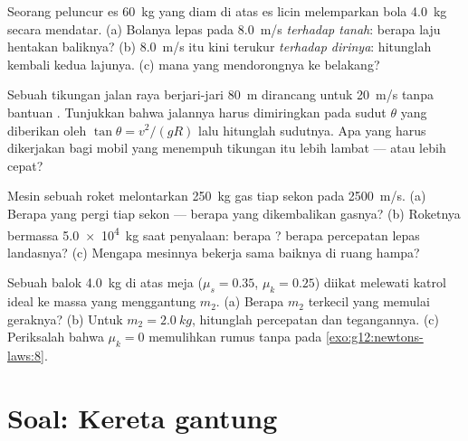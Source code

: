 \begin{exercise}[$\star\star\star$]\label{exo:g12:newtons-laws:12}
Seorang peluncur es \qty{60}{kg} yang diam di atas es licin melemparkan bola
\qty{4.0}{kg} secara mendatar. (a) Bolanya lepas pada \qty{8.0}{m/s} \emph{terhadap
tanah}: berapa laju hentakan baliknya? (b) \qty{8.0}{m/s} itu kini terukur
\emph{terhadap dirinya}: hitunglah kembali kedua lajunya. (c)  mana yang mendorongnya
ke belakang?
\end{exercise}

\begin{exercise}[$\star\star\star$]\label{exo:g12:newtons-laws:13}
Sebuah tikungan jalan raya berjari-jari \qty{80}{m} dirancang untuk \qty{20}{m/s}
tanpa bantuan . Tunjukkan bahwa jalannya harus dimiringkan pada sudut $\theta$
yang diberikan oleh $\tan\theta = v^2/(gR)$ lalu hitunglah sudutnya. Apa yang harus
dikerjakan  bagi mobil yang menempuh tikungan itu lebih lambat --- atau
lebih cepat?
\end{exercise}

\begin{exercise}[$\star\star\star$]\label{exo:g12:newtons-laws:14}
Mesin sebuah roket melontarkan \qty{250}{kg} gas tiap sekon pada \qty{2500}{m/s}. (a)
Berapa  yang pergi tiap sekon ---  berapa yang dikembalikan
gasnya? (b) Roketnya bermassa \qty{5.0e4}{kg} saat penyalaan: berapa ? berapa
percepatan lepas landasnya? (c) Mengapa mesinnya bekerja sama baiknya di ruang hampa?
\end{exercise}

\begin{exercise}[$\star\star\star$]\label{exo:g12:newtons-laws:15}
Sebuah balok \qty{4.0}{kg} di atas meja ($\mu_s = 0.35$, $\mu_k = 0.25$) diikat
melewati katrol ideal ke massa yang menggantung $m_2$. (a) Berapa $m_2$ terkecil yang
memulai geraknya? (b) Untuk $m_2 = \qty{2.0}{kg}$, hitunglah percepatan dan
tegangannya. (c) Periksalah bahwa $\mu_k = 0$ memulihkan rumus tanpa  pada
\cref{exo:g12:newtons-laws:8}.
\end{exercise}

\section{Soal: Kereta gantung}

